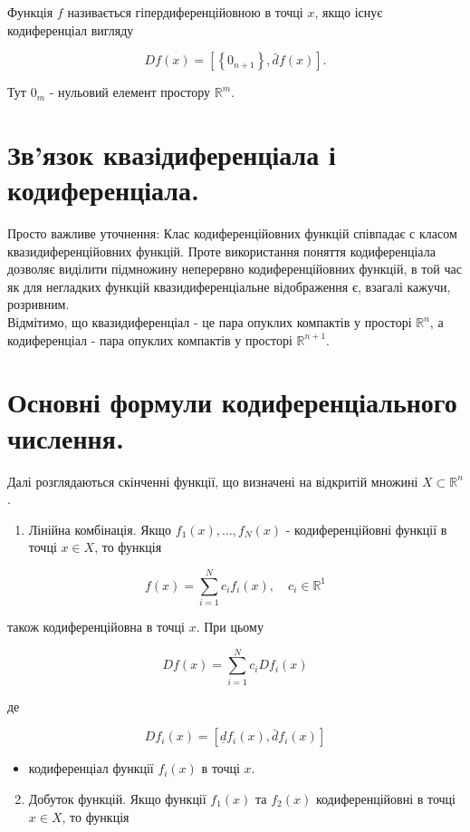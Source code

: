 \documentclass[10pt]{article}
\begin{document}
Функція $f$ називається гіпердиференційовною в точці $x$, якщо існує кодиференціал вигляду

$$
D f(x)=\left[\left\{0_{n+1}\right\}, \bar{d} f(x)\right] .
$$

Тут $0_{m}$ - нульовий елемент простору $\mathbb{R}^{m}$.

\section*{Зв'язок квазідиференціала і кодиференціала.}
Просто важливе уточнення: Клас кодиференційовних функцій співпадає с класом квазидиференційовних функцій. Проте використання поняття кодиференціала дозволяє виділити підмножину неперервно кодиференційовних функцій, в той час як для негладких функцій квазидиференціальне відображення є, взагалі кажучи, розривним.\\
Відмітимо, що квазидиференціал - це пара опуклих компактів у просторі $\mathbb{R}^{n}$, а кодиференціал - пара опуклих компактів у просторі $\mathbb{R}^{n+1}$.

\section*{Основні формули кодиференціального числення.}
Далі розглядаються скінченні функції, що визначені на відкритій множині $X \subset \mathbb{R}^{n}$.

\begin{enumerate}
  \item Лінійна комбінація. Якщо $f_{1}(x), \ldots, f_{N}(x)$ - кодиференційовні функції в точці $x \in X$, то функція
\end{enumerate}

$$
f(x)=\sum_{i=1}^{N} c_{i} f_{i}(x), \quad c_{i} \in \mathbb{R}^{1}
$$

також кодиференційовна в точці $x$. При цьому

$$
D f(x)=\sum_{i=1}^{N} c_{i} D f_{i}(x)
$$

де

$$
D f_{i}(x)=\left[\underline{d} f_{i}(x), \bar{d} f_{i}(x)\right]
$$

\begin{itemize}
  \item кодиференціал функції $f_{i}(x)$ в точці $x$.
\end{itemize}

\begin{enumerate}
  \setcounter{enumi}{1}
  \item Добуток функцій. Якщо функції $f_{1}(x)$ та $f_{2}(x)$ кодиференційовні в точці $x \in X$, то функція
\end{enumerate}
\end{document}
